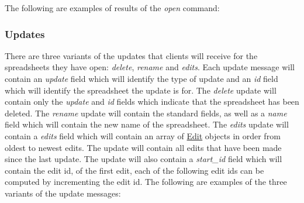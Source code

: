 The following are examples of results of the \emph{open} command:




\subsubsection{Updates}
\label{sec:message:updates}
There are three variants of the updates that clients will receive for the spreadsheets they have open: \emph{delete}, \emph{rename} and \emph{edits}.
Each update message will contain an \emph{update} field which will identify the type of update and an \emph{id} field which will identify the spreadsheet
the update is for. The \emph{delete} update will contain only the \emph{update} and \emph{id} fields which indicate that the spreadsheet has been deleted.
The \emph{rename} update will contain the standard fields, as well as a \emph{name} field which will contain the new name of the spreadsheet. The \emph{edits}
update will contain a \emph{edits} field which will contain an array of \hyperref[sec:message:edits]{Edit} objects in order from oldest to newest edits.
The update will contain all edits that have been made since the last update. The update will also contain a \emph{start\_id} field which will contain the edit id,
of the first edit, each of the following edit ids can be computed by incrementing the edit id.
The following are examples of the three variants of the update messages:



